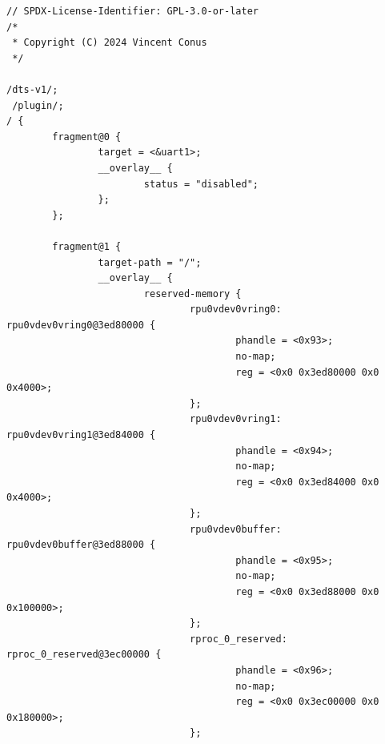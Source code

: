 \documentclass[10pt]{article}
\begin{document}
\begin{verbatim}
// SPDX-License-Identifier: GPL-3.0-or-later
/*
 * Copyright (C) 2024 Vincent Conus
 */

/dts-v1/;
 /plugin/;
/ {
        fragment@0 {
                target = <&uart1>;
                __overlay__ {
                        status = "disabled";
                };
        };

        fragment@1 {
                target-path = "/";
                __overlay__ {
                        reserved-memory {
                                rpu0vdev0vring0: rpu0vdev0vring0@3ed80000 {
                                        phandle = <0x93>;
                                        no-map;
                                        reg = <0x0 0x3ed80000 0x0 0x4000>;
                                };
                                rpu0vdev0vring1: rpu0vdev0vring1@3ed84000 {
                                        phandle = <0x94>;
                                        no-map;
                                        reg = <0x0 0x3ed84000 0x0 0x4000>;
                                };
                                rpu0vdev0buffer: rpu0vdev0buffer@3ed88000 {
                                        phandle = <0x95>;
                                        no-map;
                                        reg = <0x0 0x3ed88000 0x0 0x100000>;
                                };
                                rproc_0_reserved: rproc_0_reserved@3ec00000 {
                                        phandle = <0x96>;
                                        no-map;
                                        reg = <0x0 0x3ec00000 0x0 0x180000>;
                                };


\end{verbatim}
\end{document}
